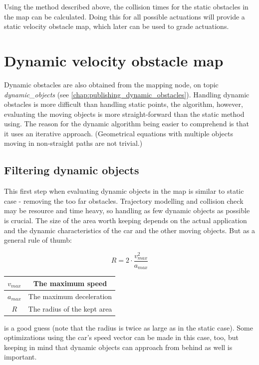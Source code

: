 Using the method described above, the collision times for the static obstacles in the map can be calculated. Doing this for all possible actuations will provide a static velocity obstacle map, which later can be used to grade actuations.

\section{Dynamic velocity obstacle map}
\label{chap:dynamic_velocity_obstacle_map}
Dynamic obstacles are also obtained from the mapping node, on topic \textit{dynamic\_objects} (see \ref{chap:publishing_dynamic_obstacles}).
Handling dynamic obstacles is more difficult than handling static points, the algorithm, however, evaluating the moving objects is more straight-forward than the static method using. The reason for the dynamic algorithm being easier to comprehend is that it uses an iterative approach. (Geometrical equations with multiple objects moving in non-straight paths are not trivial.)

\subsection{Filtering dynamic objects}
This first step when evaluating dynamic objects in the map is similar to static case - removing the too far obstacles. Trajectory modelling and collision check may be  resource and time heavy, so handling as few dynamic objects as possible is crucial. The size of the area worth keeping depends on the actual application and the dynamic characteristics of the car and the other moving objects. But as a general rule of thumb:

\begin{equation}\label{eq:extended_car_radius}
R = 2 \cdot \frac{v_{max}^2}{a_{max}}
\end{equation}

\begin{center}
    \begin{tabular}{ | c | c | }
        \hline
        $v_{max}$    & The maximum speed             \\
        \hline
        $a_{max}$    & The maximum deceleration      \\
        \hline
        $R$          & The radius of the kept area   \\
        \hline
    \end{tabular}
\end{center}

is a good guess (note that the radius is twice as large as in the static case). Some optimizations using the car's speed vector can be made in this case, too, but keeping in mind that dynamic objects can approach from behind as well is important.


